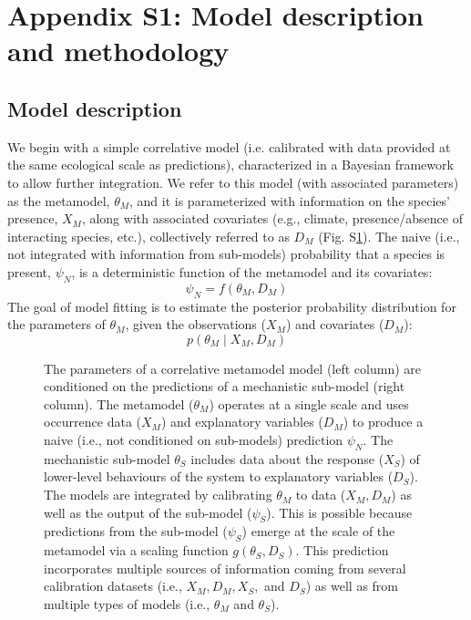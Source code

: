 \documentclass[11pt]{article}
\begin{document}
\section*{Appendix S1: Model description and methodology}
\subsection*{Model description}

We begin with a simple correlative model (i.e. calibrated with data provided at the same ecological scale as predictions), characterized in a Bayesian framework to allow further integration. 
We refer to this model (with associated parameters) as the metamodel, \(\theta_M\), and it is parameterized with information on the species' presence, \(X_M\), along with associated covariates (e.g., climate, presence/absence of interacting species, etc.), collectively referred to as \(D_M\) (Fig. S\ref{fig:diagram}). 
The naive (i.e., not integrated with information from sub-models) probability that a species is present, \(\psi_N\), is a deterministic function of the metamodel and its covariates:
\begin{equation}
\label{eq:sdm1}
	\psi_N = f(\theta_M, D_M)
\end{equation}
The goal of model fitting is to estimate the posterior probability distribution for the parameters of \(\theta_M\), given the observations (\(X_M\)) and covariates (\(D_M\)):
\begin{equation}
\label{eq:sdm2}
	p( \theta_M \mid X_M, D_M)
\end{equation}

\begin{figure}[p!]

\caption{The parameters of a correlative metamodel model (left column) are conditioned on the predictions of a mechanistic sub-model (right column).
	The metamodel ($\theta_M$) operates at a single scale and uses occurrence data (\(X_M\)) and explanatory variables ($D_M$) to produce a naive (i.e., not conditioned on sub-models) prediction $\psi_N$.
	The mechanistic sub-model \(\theta_S\) includes data about the response (\(X_S\)) of lower-level behaviours of the system to explanatory variables ($D_S$). 
	The models are integrated by calibrating $\theta_M$ to data ($X_M, D_M$) as well as the output of the sub-model ($\psi_S$). 
	This is possible because predictions from the sub-model ($\psi_S$) emerge at the scale of the metamodel via a scaling function \(g(\theta_S, D_S)\).
	This prediction incorporates multiple sources of information coming from several calibration datasets (i.e., $X_M, D_M, X_S, $ and $D_S$) as well as from multiple types of models (i.e., $\theta_M$ and $\theta_S$).}
\label{fig:diagram}
\end{figure}
\end{document}
